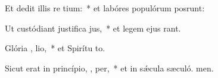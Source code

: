 \item Et dedit illis re tium:~* et labóres populórum posrunt:
\item Ut custódiant justifica jus,~* et legem ejus rant.
\item Glória ,  lio,~* et Spirítu to.
\item Sicut erat in princípio,  ,  per,~* et in sǽcula sæculó. men.
